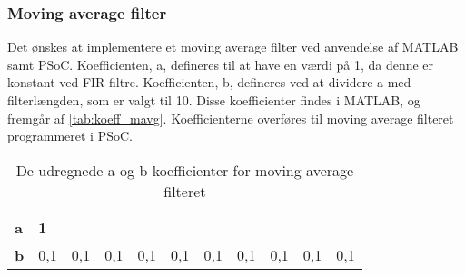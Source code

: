 \subsubsection{Moving average filter}
Det ønskes at implementere et moving average filter ved anvendelse af MATLAB samt PSoC. Koefficienten, a, defineres til at have en værdi på 1, da denne er konstant ved FIR-filtre. Koefficienten, b, defineres ved at dividere a med filterlængden, som er valgt til 10. Disse koefficienter findes i MATLAB, og fremgår af \autoref{tab:koeff_mavg}. Koefficienterne overføres til moving average filteret programmeret i PSoC. 

\begin{table}[H]
\centering
\begin{tabular}{|l|l|l|l|l|l|l|l|l|l|l|}
\hline
\textbf{a} & 1   &     &     &     &     &     &     &     &     &     \\ \hline
\textbf{b} & 0,1 & 0,1 & 0,1 & 0,1 & 0,1 & 0,1 & 0,1 & 0,1 & 0,1 & 0,1 \\ \hline
\end{tabular}
\caption{De udregnede a og b koefficienter for moving average filteret}
\label{tab:koeff_mavg}
\end{table}
